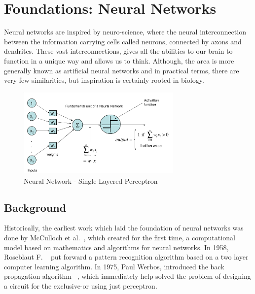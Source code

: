 \section{Foundations: Neural Networks}

 Neural networks are inspired by neuro-science, where the neural interconnection between the information carrying cells called neurons, connected by axons and dendrites. These vast interconnections, gives all the abilities to our brain to function in a unique way and allows us to think. Although, the area is more generally known as artificial neural networks and in practical terms, there are very few similarities, but inspiration is certainly rooted in biology. 

\begin{figure}[ht!]
	\centering
		\includegraphics[height=44mm,  width=80mm]{figures/3_nnsingleunit.png}
		\caption[Neural Network - Single Layered Perceptron]{Neural Network - Single Layered Perceptron \footnotemark}
			\label{nnsingleunit}
\end{figure}

\subsection{Background}
Historically, the earliest work which laid the foundation of neural networks was done by McCulloch et al.~\parencite{NNFirst:McCull}, which created for the first time, a computational model based on mathematics and algorithms for neural networks. In 1958, Roseblaut F.  ~\parencite{NNFirst:Rose} put forward a pattern recognition algorithm based on a two layer computer learning algorithm. In 1975, Paul Werbos, introduced the back propagation algorithm ~\parencite{NNFirst:Werbos}, which immediately help solved the problem of designing a circuit for the exclusive-or using just perceptron.
\newline

